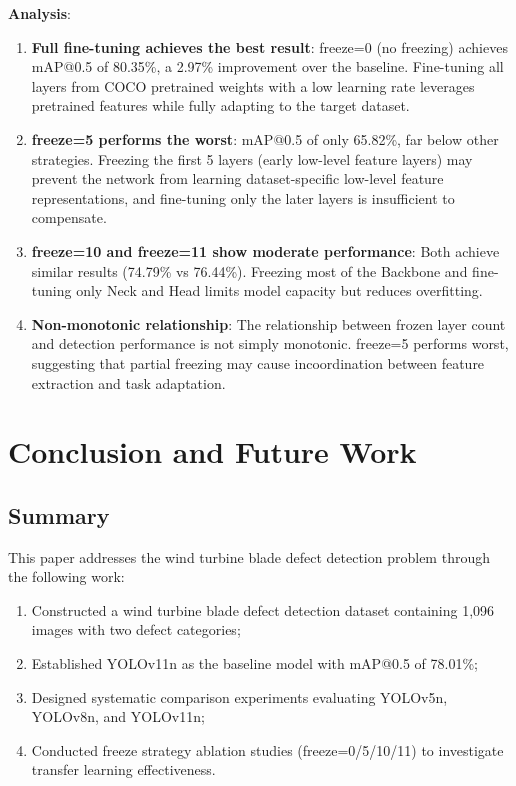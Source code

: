 \documentclass[12pt,a4paper]{article}
\begin{document}
\textbf{Analysis}:

\begin{enumerate}[noitemsep]
  \item \textbf{Full fine-tuning achieves the best result}: freeze=0 (no freezing) achieves mAP@0.5 of 80.35\%, a 2.97\% improvement over the baseline. Fine-tuning all layers from COCO pretrained weights with a low learning rate leverages pretrained features while fully adapting to the target dataset.

  \item \textbf{freeze=5 performs the worst}: mAP@0.5 of only 65.82\%, far below other strategies. Freezing the first 5 layers (early low-level feature layers) may prevent the network from learning dataset-specific low-level feature representations, and fine-tuning only the later layers is insufficient to compensate.

  \item \textbf{freeze=10 and freeze=11 show moderate performance}: Both achieve similar results (74.79\% vs 76.44\%). Freezing most of the Backbone and fine-tuning only Neck and Head limits model capacity but reduces overfitting.

  \item \textbf{Non-monotonic relationship}: The relationship between frozen layer count and detection performance is not simply monotonic. freeze=5 performs worst, suggesting that partial freezing may cause incoordination between feature extraction and task adaptation.
\end{enumerate}

\section{Conclusion and Future Work}

\subsection{Summary}

This paper addresses the wind turbine blade defect detection problem through the following work:
\begin{enumerate}[noitemsep]
  \item Constructed a wind turbine blade defect detection dataset containing 1,096 images with two defect categories;
  \item Established YOLOv11n as the baseline model with mAP@0.5 of 78.01\%;
  \item Designed systematic comparison experiments evaluating YOLOv5n, YOLOv8n, and YOLOv11n;
  \item Conducted freeze strategy ablation studies (freeze=0/5/10/11) to investigate transfer learning effectiveness.
\end{enumerate}
\end{document}
